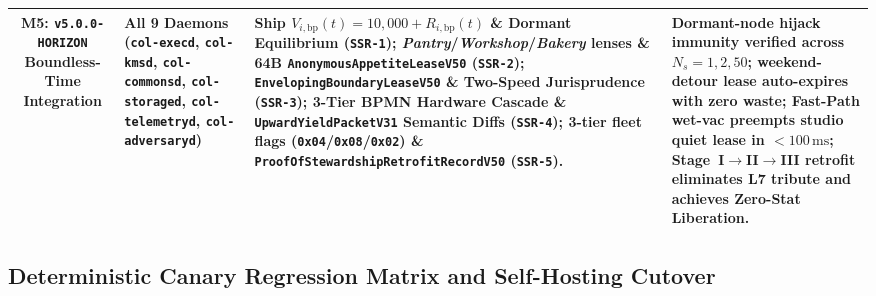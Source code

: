 \begin{table}[htbp]
{\begin{tabular}{@{}clp{4.4cm}p{5.1cm}@{}}
\addlinespace[4pt]
\textbf{M5: \texttt{v5.0.0-HORIZON} Boundless-Time Integration} & All 9 Daemons (\texttt{col-execd}, \texttt{col-kmsd}, \texttt{col-commonsd}, \texttt{col-storaged}, \texttt{col-telemetryd}, \texttt{col-adversaryd}) & Ship $V_{i,\mathrm{bp}}(t) = 10{,}000 + R_{i,\mathrm{bp}}(t)$ \& Dormant Equilibrium (\texttt{SSR-1}); \emph{Pantry}/\emph{Workshop}/\emph{Bakery} lenses \& 64B \texttt{AnonymousAppetiteLeaseV50} (\texttt{SSR-2}); \texttt{EnvelopingBoundaryLeaseV50} \& Two-Speed Jurisprudence (\texttt{SSR-3}); 3-Tier BPMN Hardware Cascade \& \texttt{UpwardYieldPacketV31} Semantic Diffs (\texttt{SSR-4}); 3-tier fleet flags (\texttt{0x04}/\texttt{0x08}/\texttt{0x02}) \& \texttt{ProofOfStewardshipRetrofitRecordV50} (\texttt{SSR-5}). & Dormant-node hijack immunity verified across $N_s=1,2,50$; weekend-detour lease auto-expires with zero waste; Fast-Path wet-vac preempts studio quiet lease in $<100\,\mathrm{ms}$; Stage~I$\to$II$\to$III retrofit eliminates L7 tribute and achieves Zero-Stat Liberation. \\
\bottomrule
\end{tabular}%
}
\end{table}

\subsection{Deterministic Canary Regression Matrix and Self-Hosting Cutover}

